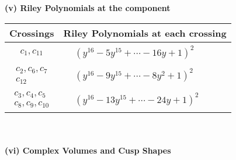 \documentclass[1p]{elsarticle_modified}
\theoremstyle{definition}
\begin{document}
\newpage\renewcommand{\arraystretch}{1}
\flushleft \textbf{(v) Riley Polynomials at the component}\newline \\
\begin{tabular}{m{50pt}|m{274pt}}
Crossings & \hspace{64pt}Riley Polynomials at each crossing \\
\hline $$\begin{aligned}c_{1},c_{11}\end{aligned}$$&$\begin{aligned}
&(y^{16}-5 y^{15}+\cdots-16 y+1)^{2}
\end{aligned}$\\
\hline $$\begin{aligned}c_{2},c_{6},c_{7}\\c_{12}\end{aligned}$$&$\begin{aligned}
&(y^{16}-9 y^{15}+\cdots-8 y^2+1)^{2}
\end{aligned}$\\
\hline $$\begin{aligned}c_{3},c_{4},c_{5}\\c_{8},c_{9},c_{10}\end{aligned}$$&$\begin{aligned}
&(y^{16}-13 y^{15}+\cdots-24 y+1)^{2}
\end{aligned}$\\
\hline
\end{tabular}\\~\\
\newpage\flushleft \textbf{(vi) Complex Volumes and Cusp Shapes}
\end{document}
